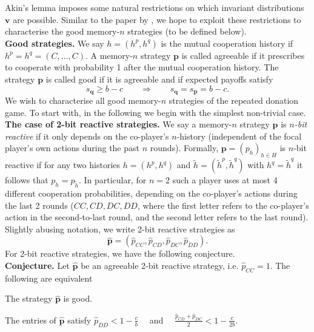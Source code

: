 \documentclass{article}
\theoremstyle{definition}
\begin{document}
Akin's lemma imposes some natural restrictions on which invariant distributions $\mathbf{v}$ are possible. Similar to the paper by \citep{akin:EGADS:2016}, we hope to exploit these restrictions to characterise the good memory-$n$ strategies (to be defined below).\\

\noindent
{\bf Good strategies.} 
We say $h\!=\!(h^p,h^q)$ is the mutual cooperation history if $h^p\!=\!h^q\!=\!(C,\ldots,C)$. 
A memory-$n$ strategy $\mathbf{p}$ is called agreeable if it prescribes to cooperate with probability 1 after the mutual cooperation history. 
The strategy $\mathbf{p}$ is called good if it is agreeable and if expected payoffs satisfy
\begin{equation} \label{Eq:good}
    s_{\mathbf{q}} \geq b\!-\!c \qquad \Rightarrow \qquad s_{\mathbf{q}} = s_{\mathbf{p}} =  b\!-\!c.
\end{equation}
We wish to characterise all good memory-$n$ strategies of the repeated donation game. To start with, in the following we begin with the simplest non-trivial case.\\

\noindent
{\bf The case of 2-bit reactive strategies.} 
We say a memory-$n$ strategy $\mathbf{p}$ is {\it $n$-bit reactive} if it only depends on the co-player's $n$-history (independent of the focal player's own actions during the past $n$ rounds). Formally, $\mathbf{p}\!=\!(p_h)_{h \in H}$ is $n$-bit reactive if for any two histories $h=(h^p,h^q)$ and $\tilde{h}=(\tilde{h}^p,\tilde{h}^q)$ with $h^q=\tilde{h}^q$ it follows that $p_h = p_{\tilde{h}}$. In particular, for $n\!=\!2$ such a player uses at most 4 different cooperation probabilities, depending on the co-player's actions during the last 2 rounds ($CC, CD, DC, DD$, where the first letter refers to the co-player's action in the second-to-last round, and the second letter refers to the last round). Slightly abusing notation, we write 2-bit reactive strategies as 
\begin{equation}
\mathbf{\hat{p}} = (\hat{p}_{CC}, \hat{p}_{CD}, \hat{p}_{DC}, \hat{p}_{DD}). 
\end{equation}
For 2-bit reactive strategies, we have the following conjecture.\\

\noindent
{\bf Conjecture.}
Let $\mathbf{\hat{p}}$ be an agreeable 2-bit reactive strategy, i.e. $\hat{p}_{CC}\!=\!1$. The following are equivalent\\[-0.7cm]
\begin{description} \setlength\itemsep{0pt}
\item[({\it i})] The strategy $\mathbf{\hat{p}}$ is good.
\item[({\it ii})] The entries of $\mathbf{\hat{p}}$ satisfy $\displaystyle \hat{p}_{DD} < 1\!-\! \frac{c}{b}$  ~~and~~ $\displaystyle \frac{\hat{p}_{CD} + \hat{p}_{DC}}{2} < 1-\frac{c}{2b}$.
\end{description}
\end{document}
